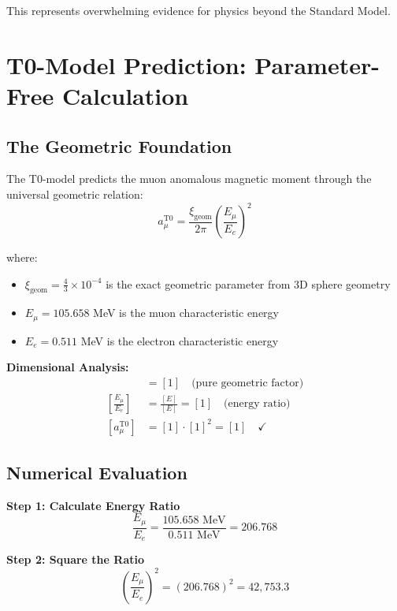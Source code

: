 \documentclass[12pt,a4paper]{report}
\newcommand{\xigeom}{\xi_{\text{geom}}}   %
\newcommand{\Ee}{E_e}                     %
\newcommand{\Emu}{E_\mu}                  %
\begin{document}
This represents overwhelming evidence for physics beyond the Standard Model.

\section{T0-Model Prediction: Parameter-Free Calculation}
\label{sec:t0_prediction}

\subsection{The Geometric Foundation}
\label{subsec:geometric_foundation}

The T0-model predicts the muon anomalous magnetic moment through the universal geometric relation:
\begin{equation}
	a_\mu^{\text{T0}} = \frac{\xigeom}{2\pi} \left(\frac{\Emu}{\Ee}\right)^2
	\label{eq:t0_prediction}
\end{equation}

where:
\begin{itemize}
	\item $\xigeom = \frac{4}{3} \times 10^{-4}$ is the exact geometric parameter from 3D sphere geometry
	\item $\Emu = 105.658$ MeV is the muon characteristic energy
	\item $\Ee = 0.511$ MeV is the electron characteristic energy
\end{itemize}

\textbf{Dimensional Analysis:}
\begin{align}
	[\xigeom] &= [1] \quad \text{(pure geometric factor)} \\
	\left[\frac{\Emu}{\Ee}\right] &= \frac{[E]}{[E]} = [1] \quad \text{(energy ratio)} \\
	[a_\mu^{\text{T0}}] &= [1] \cdot [1]^2 = [1] \quad \checkmark
\end{align}

\subsection{Numerical Evaluation}
\label{subsec:numerical_evaluation}

\textbf{Step 1: Calculate Energy Ratio}
\begin{equation}
	\frac{\Emu}{\Ee} = \frac{105.658 \text{ MeV}}{0.511 \text{ MeV}} = 206.768
	\label{eq:energy_ratio}
\end{equation}

\textbf{Step 2: Square the Ratio}
\begin{equation}
	\left(\frac{\Emu}{\Ee}\right)^2 = (206.768)^2 = 42,753.3
	\label{eq:energy_ratio_squared}
\end{equation}
\end{document}
